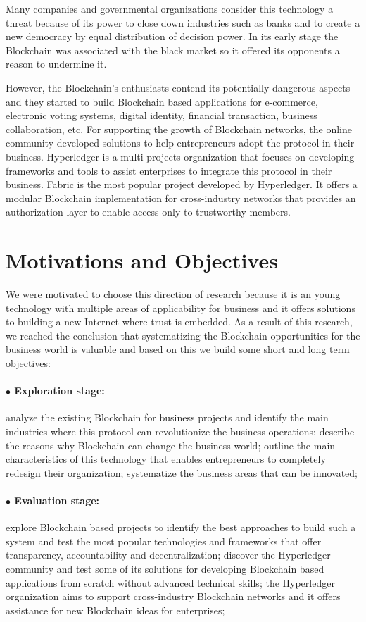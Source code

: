 Many companies and governmental organizations consider this technology a threat because of its power to close down industries such as banks and to create a new democracy by equal distribution of decision power. In its early stage the Blockchain was associated with the black market so it offered its opponents a reason to undermine it.

However, the Blockchain's enthusiasts contend its potentially dangerous aspects and they started to build Blockchain based applications for e-commerce, electronic voting systems, digital identity, financial transaction, business collaboration, etc. For supporting the growth of Blockchain networks, the online community developed solutions to help entrepreneurs adopt the protocol in their business. 
Hyperledger is a multi-projects organization that focuses on developing frameworks and tools to assist enterprises to integrate this protocol in their business.
Fabric is the most popular project developed by Hyperledger. It offers a modular Blockchain implementation for cross-industry networks that provides an authorization layer to enable access only to trustworthy members. 


\section{Motivations and Objectives}
\label{sec:intro-section2}
We were motivated to choose this direction of research because it is an young technology with multiple areas of applicability for business and it offers solutions to building a new Internet where trust is embedded. As a result of this research, we reached the conclusion that systematizing the Blockchain opportunities for the business world is valuable and based on this we build some short and long term objectives:

\paragraph{$\bullet$ Exploration stage:} analyze the existing Blockchain for business projects and identify the main industries  where this protocol can revolutionize the business operations; describe the reasons why Blockchain can change the business world; outline the main characteristics of this technology that enables entrepreneurs to completely redesign their organization; systematize the business areas that can be innovated;
	
\paragraph{$\bullet$ Evaluation stage:} explore Blockchain based projects to identify the best approaches to build such a system and test the most popular technologies and frameworks that offer transparency, accountability and decentralization; discover the Hyperledger community and test some of its solutions for developing Blockchain based applications from scratch without advanced technical skills; the Hyperledger organization aims to support cross-industry Blockchain networks and it offers assistance for new Blockchain ideas for enterprises;
	
